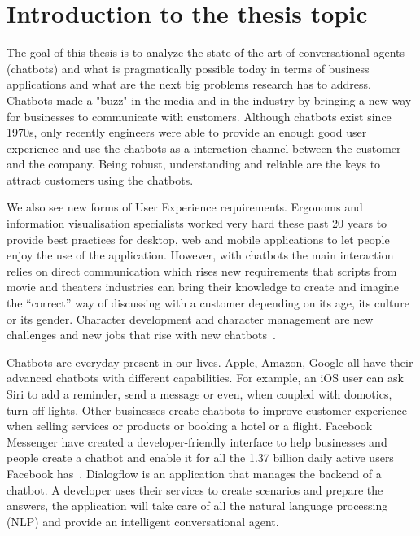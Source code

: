 
\chapter{Introduction to the thesis topic} %

\label{Chapter1} %

The goal of this thesis is to analyze the state-of-the-art of conversational agents (chatbots) and what is pragmatically possible today in terms of business applications and what are the next big problems research has to address. Chatbots made a "buzz" in the media and in the industry by bringing a new way for businesses to communicate with customers. Although chatbots exist since 1970s, only recently engineers were able to provide an enough good user experience and use the chatbots as a interaction channel between the customer and the company. Being robust, understanding and reliable are the keys to attract customers using the chatbots.

We also see new forms of User Experience requirements. Ergonoms and information visualisation specialists worked very hard these past 20 years to provide best practices for desktop, web and mobile applications to let people enjoy the use of the application. However, with chatbots the main interaction relies on direct communication which rises new requirements that scripts from movie and theaters industries can bring their knowledge to create and imagine the ``correct'' way of discussing with a customer depending on its age, its culture or its gender. Character development and character management are new challenges and new jobs that rise with new chatbots~\citep{1704.04579}.


Chatbots are everyday present in our lives. Apple, Amazon, Google all have their advanced chatbots with different capabilities. For example, an iOS user can ask Siri to add a reminder, send a message or even, when coupled with domotics, turn off lights. Other businesses create chatbots to improve customer experience when selling services or products or booking a hotel or a flight. Facebook Messenger have created a developer-friendly interface to help businesses and people create a chatbot and enable it for all the 1.37 billion daily active users Facebook has~\citep{facebook3rdquarter2017}. Dialogflow is an application that manages the backend of a chatbot. A developer uses their services to create scenarios and prepare the answers, the application will take care of all the natural language processing (NLP) and provide an intelligent conversational agent.

